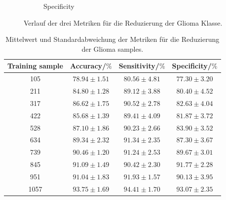 \begin{figure}[H]
\begin{subfigure}[b]{0.48\textwidth}
    \caption{Specificity}
    \label{fig:gli-red-spec}
  \end{subfigure}
  \caption{Verlauf der drei Metriken für die Reduzierung der Glioma Klasse.}
  \label{fig:gli-men-gliored}
\end{figure}
\begin{table}[H]
    \centering
    {\small
        \begin{tabular}{cccc}
            \toprule
            Training sample & Accuracy/$\%$ & Sensitivity/$\%$ & Specificity/$\%$\\
            \midrule
            105  & $78.94 \pm 1.51$ & $80.56 \pm 4.81$ & $ 77.30 \pm 3.20$ \\
            211  & $84.80 \pm 1.28$ & $89.12 \pm 3.88$ & $ 80.40 \pm 4.52$ \\
            317  & $86.62 \pm 1.75$ & $90.52 \pm 2.78$ & $ 82.63 \pm 4.04$ \\
            422  & $85.68 \pm 1.39$ & $89.41 \pm 4.09$ & $ 81.87 \pm 3.72$ \\
            528  & $87.10 \pm 1.86$ & $90.23 \pm 2.66$ & $ 83.90 \pm 3.52$ \\
            634  & $89.34 \pm 2.32$ & $91.34 \pm 2.35$ & $ 87.30 \pm 3.67$ \\
            739  & $90.46 \pm 1.20$ & $91.24 \pm 2.53$ & $ 89.67 \pm 3.01$ \\
            845  & $91.09 \pm 1.49$ & $90.42 \pm 2.30$ & $ 91.77 \pm 2.28$ \\
            951  & $91.04 \pm 1.83$ & $91.93 \pm 1.57$ & $ 90.13 \pm 3.95$ \\
            1057 & $93.75 \pm 1.69$ & $94.41 \pm 1.70$ & $ 93.07 \pm 2.35$ \\
            \bottomrule
        \end{tabular}}
  \caption{Mittelwert und Standardabweichung der Metriken für die Reduzierung der Glioma samples.}
  \label{tab:red-gli}
\end{table}

